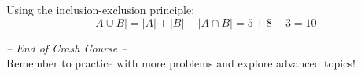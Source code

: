 \documentclass[11pt,a4paper]{article}
\theoremstyle{definition}
\begin{document}
\begin{tcolorbox}[colback=green!10,colframe=green!50!black,title=Exercise 3 Solution]
Using the inclusion-exclusion principle:
$$|A \cup B| = |A| + |B| - |A \cap B| = 5 + 8 - 3 = 10$$
\end{tcolorbox}

\vfill

\begin{center}
\textit{-- End of Crash Course --}\\
\small{Remember to practice with more problems and explore advanced topics!}
\end{center}
\end{document}

